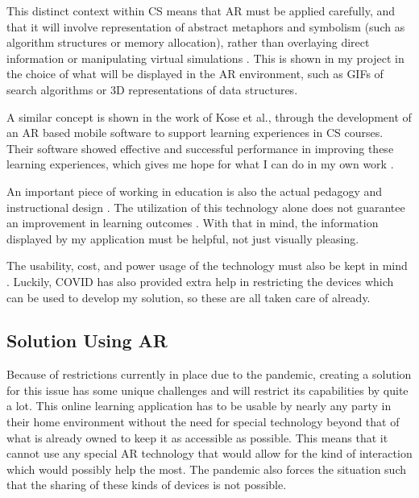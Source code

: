 \documentclass[sigconf]{acmart}
\begin{document}
This distinct context within CS means that AR must be applied carefully, and that it will involve representation of abstract metaphors and symbolism (such as algorithm structures or memory allocation), rather than overlaying direct information or manipulating virtual simulations \cite{resnyansky18}. This is shown in my project in the choice of what will be displayed in the AR environment, such as GIFs of search algorithms or 3D representations of data structures.

A similar concept is shown in the work of Kose et al., through the development of an AR based mobile software to support learning experiences in CS courses. Their software showed effective and successful performance in improving these learning experiences, which gives me hope for what I can do in my own work \cite{kose13}.

An important piece of working in education is also the actual pedagogy and instructional design \cite{kesim12}. The utilization of this technology alone does not guarantee an improvement in learning outcomes \cite{bower14}. With that in mind, the information displayed by my application must be helpful, not just visually pleasing.

The usability, cost, and power usage of the technology must also be kept in mind \cite{antonioli14}. Luckily, COVID has also provided extra help in restricting the devices which can be used to develop my solution, so these are all taken care of already.

\subsection{Solution Using AR}
Because of restrictions currently in place due to the pandemic, creating a solution for this issue has some unique challenges and will restrict its capabilities by quite a lot. This online learning application has to be usable by nearly any party in their home environment without the need for special technology beyond that of what is already owned to keep it as accessible as possible. This means that it cannot use any special AR technology that would allow for the kind of interaction which would possibly help the most. The pandemic also forces the situation such that the sharing of these kinds of devices is not possible.
\end{document}
